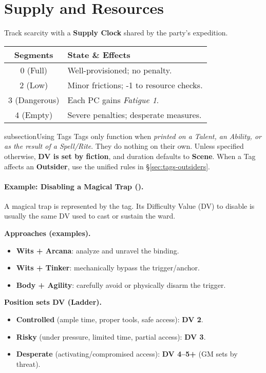 \section{Supply and Resources}
\label{world:supply}
Track scarcity with a \textbf{Supply Clock} shared by the party's expedition.
\begin{center}
\begin{tabular}{cl}
\toprule
\textbf{Segments} & \textbf{State \& Effects} \\
\midrule
0 (Full) & Well-provisioned; no penalty. \\
2 (Low) & Minor frictions; -1 to resource checks. \\
3 (Dangerous) & Each PC gains \emph{Fatigue 1}. \\
4 (Empty) & Severe penalties; desperate measures. \\
\bottomrule
\end{tabular}
\end{center}

subsection{Using Tags}
Tags only function when \emph{printed on a Talent, an Ability, or as the result of a Spell/Rite}. 
They do nothing on their own. 
Unless specified otherwise, \textbf{DV is set by fiction}, and duration defaults to \textbf{Scene}. 
When a Tag affects an \textbf{Outsider}, use the unified rules in \S\ref{sec:tags-outsiders}.

\paragraph{Example: Disabling a Magical Trap (\WARD).}
A magical trap is represented by the \WARD tag. Its Difficulty Value (DV) to disable is usually the same DV used to cast or sustain the ward.

\textbf{Approaches (examples).}
\begin{itemize}
  \item \textbf{Wits + Arcana}: analyze and unravel the binding.
  \item \textbf{Wits + Tinker}: mechanically bypass the trigger/anchor.
  \item \textbf{Body + Agility}: carefully avoid or physically disarm the trigger.
\end{itemize}

\textbf{Position sets DV (Ladder).}
\begin{itemize}
  \item \textbf{Controlled} (ample time, proper tools, safe access): \textbf{DV 2}.
  \item \textbf{Risky} (under pressure, limited time, partial access): \textbf{DV 3}.
  \item \textbf{Desperate} (activating/compromised access): \textbf{DV 4–5+} (GM sets by threat).
\end{itemize}

